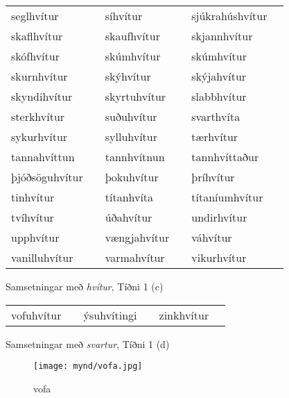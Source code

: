 \documentclass{../litmal.tex}{subfiles}
\begin{document}
\begin{wordlist}[H]
\begin{tcolorbox}
\begin{tabular}{BlBlBl}
		seglhvítur	&		& 
		síhvítur		&		& 
		sjúkrahúshvítur &		\\  %
		skaflhvítur	&		& 
		skaufhvítur	&		& 
		skjannhvítur	&		\\  %
		skófhvítur	&		& 
		skúmhvítur	&		& 
		skúmhvítur	&		\\  %
		skurnhvítur	&		& 
		skýhvítur	&		& 
		skýjahvítur	&		\\  %
		skyndihvítur 	&		& 
		skyrtuhvítur	&		& 
		slabbhvítur	&		\\  %
		sterkhvítur	&		& 
		suðuhvítur	&		& 
		svarthvíta	&		\\  %
		sykurhvítur	&		& 
		sylluhvítur	&		& 
		tærhvítur	&		\\  %
		tannahvíttun	&		& 
		tannhvítnun	&		& 
		tannhvíttaður	&		\\  %
		þjóðsöguhvítur & 	& 
		þokuhvítur	&		& 	
		þríhvítur		&		\\  %
		tinhvítur		&		& 
		títanhvíta	&		& 
		títaníumhvítur &		\\  %
		tvíhvítur		&		& 
		úðahvítur	&		& 
		undirhvítur	&		\\  %
		upphvítur	&		& 
		vængjahvítur	&		& 
		váhvítur		&		\\  %
		vanilluhvítur 	&		& 
		varmahvítur	&		& 
		vikurhvítur	&		  %
	\end{tabular}
\end{tcolorbox}
	\caption{Samsetningar með \textit{hvítur}, Tíðni 1 (c)}
	\label{listi:hvitt:1c}
\end{wordlist}		

\begin{wordlist}[H]
\begin{tcolorbox}
	\setlength{\extrarowheight}{3pt}
	\begin{tabular}{BlBlBl}	
		vofuhvítur	& 		& 
		ýsuhvítingi	&		& 
		zinkhvítur	&		 
	\end{tabular}
\end{tcolorbox}
	\caption{Samsetningar með \textit{svartur}, Tíðni 1 (d)}
	\label{listi:svart:1d}
\end{wordlist}	

\begin{figure}[H]
\begin{tcolorbox}
\centering
	\texttt{[image: mynd/vofa.jpg]}
\end{tcolorbox}
	\caption{vofa}
	\label{mynd:vofa}
\end{figure}
\end{document}
